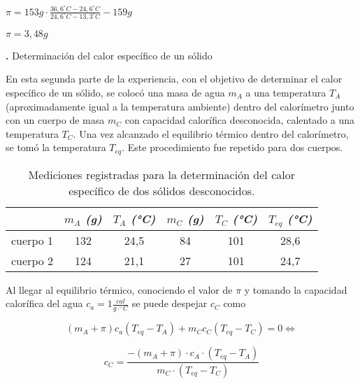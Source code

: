 \documentclass[12pt, a4paper]{article}
\newcounter{step}
\newcommand{\step}[1]
{
  \par\vspace{2ex}
  \stepcounter{step}
  \noindent\textbf{\arabic{step}.} #1\par\vspace{1ex}
}
\begin{document}
\begin{center}
    $ \pi = 153g \cdot \frac{36,6 ^\circ C - 24,6 ^\circ C }{24,6 ^\circ C - 13,3 ^\circ C } - 159g $
\end{center}

\begin{center}
    $ \pi = 3,48 g $
\end{center}


\step{Determinación del calor específico de un sólido}

En esta segunda parte de la experiencia, con el objetivo de determinar el calor específico de un sólido, se colocó una masa de agua $m_A$ a una temperatura $T_A$ (aproximadamente igual a la temperatura ambiente) dentro del calorímetro junto con un cuerpo de masa $m_C$ con capacidad calorífica desconocida, calentado a una temperatura $T_C$. Una vez alcanzado el equilibrio térmico dentro del calorímetro, se tomó la temperatura $T_{eq}$. Este procedimiento fue repetido para dos cuerpos.

\begin{table}[h!]
\centering
    \begin{tabular}{|c|c|c|c|c|c|}
        \hline
            & \textit{$m_A$ (g)} & \textit{$T_A$ (°C)} & \textit{$m_C$ (g)} & \textit{$T_C$ (°C)} & \textit{$T_{eq}$ (°C)} \\
        \hline
            cuerpo 1 & 132 & 24,5 & 84 & 101 & 28,6 \\
        \hline
            cuerpo 2 & 124 & 21,1 & 27 & 101 & 24,7 \\
        \hline
    \end{tabular}
\caption{Mediciones registradas para la determinación del calor específico de dos sólidos desconocidos.}
\end{table}


Al llegar al equilibrio térmico, conociendo el valor de $\pi$ y tomando la capacidad calorífica del agua $c_a =  1 \frac{cal}{g \cdot ^\circ C}$ se puede despejar $c_C$ como

\begin{equation}
    (m_A + \pi) c_a (T_{eq} - T_A) + m_C c_C (T_{eq} - T_C) = 0 \Longleftrightarrow
\end{equation}

\begin{equation}
    c_C = \frac{ - (m_A + \pi) \cdot c_A \cdot (T_{eq} - T_A) }{ m_C \cdot (T_{eq} - T_C) }
\end{equation}
\end{document}
